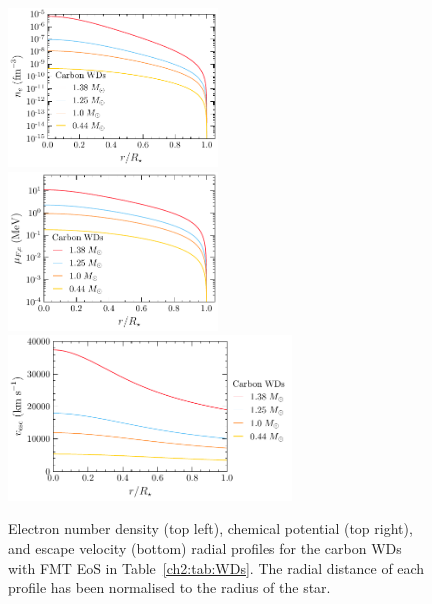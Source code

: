 \begin{figure}[t!bp]
    \centering
    \includegraphics[width = 0.495\textwidth]{ne_prof.pdf}  
    \includegraphics[width = 0.495\textwidth]{muFe_prof.pdf}  
    \includegraphics[width = 0.67\textwidth]{vesc_prof.pdf}
    \caption[Electron number density (top left), chemical potential (top right), and escape velocity (bottom) radial profiles for the carbon WDs with FMT EoS in Table~\ref{ch2:tab:WDs}.]{Electron number density (top left), chemical potential (top right), and escape velocity (bottom) radial profiles for the carbon WDs with FMT EoS in Table~\ref{ch2:tab:WDs}. The radial distance of each profile has been normalised to the radius of the star.}
    \label{ch2:fig:WDradprofs}
\end{figure}


